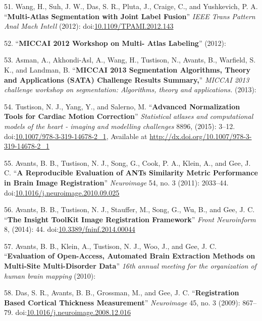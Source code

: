 \documentclass[11pt,]{article}
\begin{document}
\hypertarget{ref-Wang:2012aa}{}
51. Wang, H., Suh, J. W., Das, S. R., Pluta, J., Craige, C., and
Yushkevich, P. A. ``\textbf{Multi-Atlas Segmentation with Joint Label
Fusion}'' \emph{IEEE Trans Pattern Anal Mach Intell} (2012):
doi:\href{https://doi.org/10.1109/TPAMI.2012.143}{10.1109/TPAMI.2012.143}

\hypertarget{ref-Landman2012}{}
52. ``\textbf{MICCAI 2012 Workshop on Multi- Atlas Labeling}'' (2012):

\hypertarget{ref-Asman2013}{}
53. Asman, A., Akhondi-Asl, A., Wang, H., Tustison, N., Avants, B.,
Warfield, S. K., and Landman, B. ``\textbf{MICCAI 2013 Segmentation
Algorithms, Theory and Applications (SATA) Challenge Results Summary,}''
\emph{MICCAI 2013 challenge workshop on segmentation: Algorithms, theory
and applications.} (2013):

\hypertarget{ref-Tustison:2015ab}{}
54. Tustison, N. J., Yang, Y., and Salerno, M. ``\textbf{Advanced
Normalization Tools for Cardiac Motion Correction}'' \emph{Statistical
atlases and computational models of the heart - imaging and modelling
challenges} 8896, (2015): 3--12.
doi:\href{https://doi.org/10.1007/978-3-319-14678-2_1}{10.1007/978-3-319-14678-2\_1},
Available at \url{http://dx.doi.org/10.1007/978-3-319-14678-2_1}

\hypertarget{ref-Avants:2011ab}{}
55. Avants, B. B., Tustison, N. J., Song, G., Cook, P. A., Klein, A.,
and Gee, J. C. ``\textbf{A Reproducible Evaluation of ANTs Similarity
Metric Performance in Brain Image Registration}'' \emph{Neuroimage} 54,
no. 3 (2011): 2033--44.
doi:\href{https://doi.org/10.1016/j.neuroimage.2010.09.025}{10.1016/j.neuroimage.2010.09.025}

\hypertarget{ref-Avants:2014aa}{}
56. Avants, B. B., Tustison, N. J., Stauffer, M., Song, G., Wu, B., and
Gee, J. C. ``\textbf{The Insight ToolKit Image Registration Framework}''
\emph{Front Neuroinform} 8, (2014): 44.
doi:\href{https://doi.org/10.3389/fninf.2014.00044}{10.3389/fninf.2014.00044}

\hypertarget{ref-Avants:2010ab}{}
57. Avants, B. B., Klein, A., Tustison, N. J., Woo, J., and Gee, J. C.
``\textbf{Evaluation of Open-Access, Automated Brain Extraction Methods
on Multi-Site Multi-Disorder Data}'' \emph{16th annual meeting for the
organization of human brain mapping} (2010):

\hypertarget{ref-Das:2009aa}{}
58. Das, S. R., Avants, B. B., Grossman, M., and Gee, J. C.
``\textbf{Registration Based Cortical Thickness Measurement}''
\emph{Neuroimage} 45, no. 3 (2009): 867--79.
doi:\href{https://doi.org/10.1016/j.neuroimage.2008.12.016}{10.1016/j.neuroimage.2008.12.016}
\end{document}
